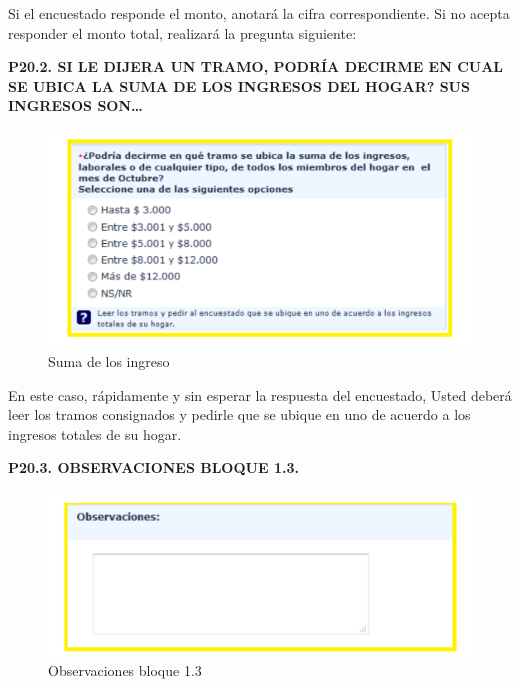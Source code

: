 \documentclass[
  openany]{book}
\begin{document}
Si el encuestado responde el monto, anotará la cifra correspondiente. Si no acepta responder el monto total, realizará la pregunta siguiente:

\textbf{P20.2. SI LE DIJERA UN TRAMO, PODRÍA DECIRME EN CUAL SE UBICA LA SUMA DE LOS INGRESOS DEL HOGAR? SUS INGRESOS SON\ldots{}}

\begin{figure}

{\centering \includegraphics[width=1\linewidth]{imagenes/figura6-62} 

}

\caption{Suma de los ingreso}\label{fig:sumaingresos}
\end{figure}

En este caso, rápidamente y sin esperar la respuesta del encuestado, Usted deberá leer los tramos consignados y pedirle que se ubique en uno de acuerdo a los ingresos totales de su hogar.

\textbf{P20.3. OBSERVACIONES BLOQUE 1.3.}

\begin{figure}

{\centering \includegraphics[width=1\linewidth]{imagenes/figura6-63} 

}

\caption{Observaciones bloque 1.3}\label{fig:observbloque}
\end{figure}
\end{document}
